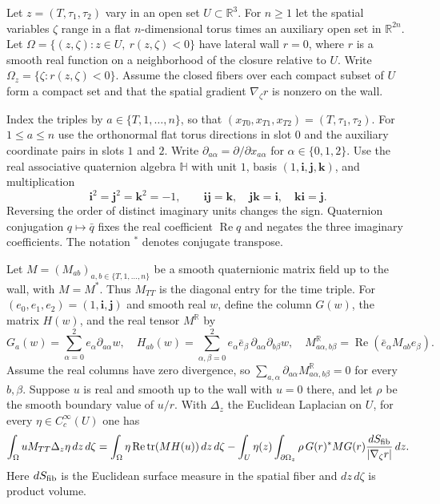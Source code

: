 Let $z=(T,\tau_1,\tau_2)$ vary in an open set $U\subset\mathbb R^3$. For $n\ge1$ let the spatial variables $\zeta$ range in a flat $n$-dimensional torus times an auxiliary open set in $\mathbb R^{2n}$. Let
$\Omega=\{(z,\zeta):z\in U,\ r(z,\zeta)<0\}$ have lateral wall $r=0$, where $r$ is a smooth real function on a neighborhood of the closure relative to $U$. Write $\Omega_z=\{\zeta:r(z,\zeta)<0\}$. Assume the closed fibers over each compact subset of $U$ form a compact set and that the spatial gradient $\nabla_\zeta r$ is nonzero on the wall.

Index the triples by $a\in\{T,1,\ldots,n\}$, so that $(x_{T0},x_{T1},x_{T2})=(T,\tau_1,\tau_2)$. For $1\le a\le n$ use the orthonormal flat torus directions in slot $0$ and the auxiliary coordinate pairs in slots $1$ and $2$. Write $\partial_{a\alpha}=\partial/\partial x_{a\alpha}$ for $\alpha\in\{0,1,2\}$. Use the real associative quaternion algebra $\mathbb H$ with unit $1$, basis $(1,\mathbf i,\mathbf j,\mathbf k)$, and multiplication
\[
 \mathbf i^2=\mathbf j^2=\mathbf k^2=-1,\qquad
 \mathbf i\mathbf j=\mathbf k,\quad
 \mathbf j\mathbf k=\mathbf i,\quad
 \mathbf k\mathbf i=\mathbf j .
\]
Reversing the order of distinct imaginary units changes the sign. Quaternion conjugation $q\mapsto\bar q$ fixes the real coefficient $\operatorname{Re}q$ and negates the three imaginary coefficients. The notation $^*$ denotes conjugate transpose.

Let $M=(M_{ab})_{a,b\in\{T,1,\ldots,n\}}$ be a smooth quaternionic matrix field up to the wall, with $M=M^*$. Thus $M_{TT}$ is the diagonal entry for the time triple. For $(e_0,e_1,e_2)=(1,\mathbf i,\mathbf j)$ and smooth real $w$, define the column $G(w)$, the matrix $H(w)$, and the real tensor $M^{\mathbb R}$ by
\[
G_a(w)=\sum_{\alpha=0}^2e_\alpha\partial_{a\alpha}w,\quad
H_{ab}(w)=\sum_{\alpha,\beta=0}^2e_\alpha\bar e_\beta\,\partial_{a\alpha}\partial_{b\beta}w,\quad
M^\mathbb R_{a\alpha,b\beta}=\operatorname{Re}(\bar e_\alpha M_{ab}e_\beta).
\]
Assume the real columns have zero divergence, so $\sum_{a,\alpha}\partial_{a\alpha}M^\mathbb R_{a\alpha,b\beta}=0$ for every $b,\beta$. Suppose $u$ is real and smooth up to the wall with $u=0$ there, and let $\rho$ be the smooth boundary value of $u/r$. With $\Delta_z$ the Euclidean Laplacian on $U$, for every $\eta\in C_c^\infty(U)$ one has
\[
 \int_\Omega u M_{TT}\Delta_z\eta\,dz\,d\zeta
 = \int_\Omega \eta\operatorname{Re}\operatorname{tr}(MH(u))\,dz\,d\zeta
 - \int_U \eta(z)\int_{\partial\Omega_z}\rho\,G(r)^*MG(r)
                 \frac{dS_{\rm fib}}{|\nabla_\zeta r|}\,dz .
\]
Here $dS_{\rm fib}$ is the Euclidean surface measure in the spatial fiber and $dz\,d\zeta$ is product volume.
